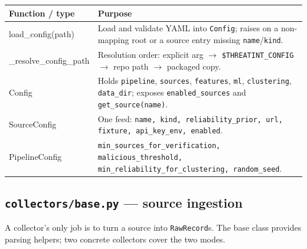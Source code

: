 \documentclass[11pt,a4paper]{article}
\newcommand{\code}[1]{\texttt{\small #1}}
\begin{document}
\begin{center}
\begin{tabularx}{\linewidth}{@{}>{\ttfamily\small}p{4.4cm}X@{}}
\toprule
\rowcolor{paper}\textbf{Function / type} & \textbf{Purpose} \\
\midrule
load\_config(path) & Load and validate YAML into \code{Config}; raises on a non-mapping root or a source entry missing \code{name}/\code{kind}. \\
\_resolve\_config\_path & Resolution order: explicit arg $\rightarrow$ \code{\$THREATINT\_CONFIG} $\rightarrow$ repo path $\rightarrow$ packaged copy. \\
Config & Holds \code{pipeline}, \code{sources}, \code{features}, \code{ml}, \code{clustering}, \code{data\_dir}; exposes \code{enabled\_sources} and \code{get\_source(name)}. \\
SourceConfig & One feed: \code{name, kind, reliability\_prior, url, fixture, api\_key\_env, enabled}. \\
PipelineConfig & \code{min\_sources\_for\_verification, malicious\_threshold, min\_reliability\_for\_clustering, random\_seed}. \\
\bottomrule
\end{tabularx}
\end{center}

\subsection{\code{collectors/base.py} --- source ingestion}
A collector's only job is to turn a source into \code{RawRecord}s. The base
class provides parsing helpers; two concrete collectors cover the two modes.
\end{document}
